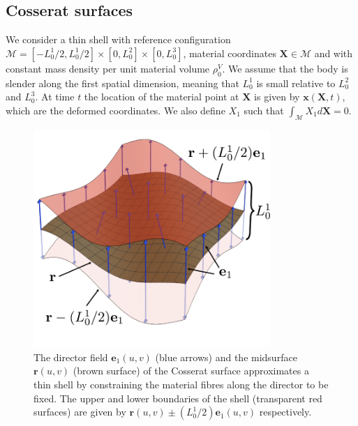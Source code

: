 \subsection{Cosserat surfaces} \label{sec:cosserat surfaces}

We consider a thin shell with reference configuration $\mathscr{M} = [-L_0^1/2, L_0^1/2] \times [0, L_0^2] \times [0, L_0^3]$, material coordinates $\mathbf{X} \in \mathscr{M}$ and with constant mass density per unit material volume $\rho^V_0$. We assume that the body is slender along the first spatial dimension, meaning that $L_0^1$ is small relative to $L_0^2$ and $L_0^3$. At time $t$ the location of the material point at $\mathbf{X}$ is given by $\mathbf{x}(\mathbf{X}, t)$, which are the deformed coordinates. We also define $X_1$ such that $\int_\mathscr{M} X_1 d \mathbf{X} = 0$.

\begin{figure}[t]
\centering
        \includegraphics[width=0.8\textwidth]{figs_part2/cosserat_surface/cosserat_kinematics.pdf}
        \caption{The director field $\mathbf{e}_1(u,v)$ (blue arrows) and the midsurface $\mathbf{r}(u,v)$ (brown surface) of the Cosserat surface approximates a thin shell by constraining the material fibres along the director to be fixed. The upper and lower boundaries of the shell (transparent red surfaces) are given by $\mathbf{r}(u,v) \pm (L_0^1 / 2) \mathbf{e}_1(u,v)$ respectively.}
        \label{fig:cosserat surface}
\end{figure}

